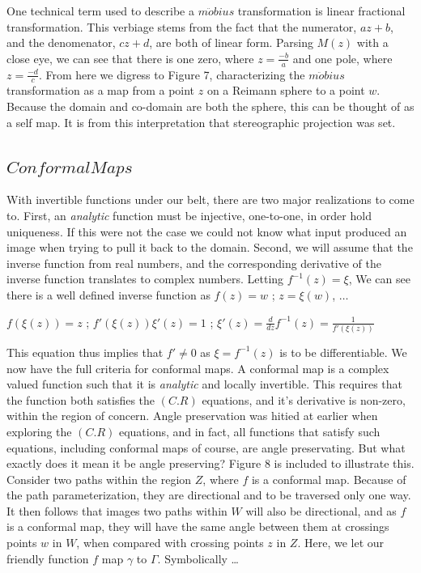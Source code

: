 \documentclass[a4paper,man,natbib]{apa6}
\begin{document}
One technical term used to describe a $ m\ddot{o}bius $ transformation is linear fractional transformation.
This verbiage stems from the fact that the numerator, $ az + b $, and the denomenator, $ cz + d $, are both of linear form.
Parsing $ M(z) $ with a close eye, we can see that there is one zero, where $ z = \frac{-b}{a} $ and one pole, where $ z = \frac{-d}{c} $.
From here we digress to Figure 7, characterizing the $ m\ddot{o}bius $ transformation as a map from a point $ z $ on a Reimann sphere to a point $ w $.
Because the domain and co-domain are both the sphere, this can be thought of as a self map. It is from this interpretation that stereographic projection was set.

\subsection{$ Conformal Maps $}

With invertible functions under our belt, there are two major realizations to come to.
First, an \textit{analytic} function must be injective, one-to-one, in order hold uniqueness.
If this were not the case we could not know what input produced an image when trying to pull it back to the domain.
Second, we will assume that the inverse function from real numbers, and the corresponding derivative of the inverse function translates to complex numbers.
Letting $ f^{-1}(z) = \xi $, We can see there is a well defined inverse function as $ f(z) = w $ ; $ z = \xi(w) $, $ \dots $

\begin{center}

      $ f(\xi(z)) = z $ ; $ f'(\xi(z))\xi'(z) = 1 $ ; $ \xi'(z) = \frac{d}{dz}f^{-1}(z) = \frac{1}{f'(\xi(z))} $

\end{center}

This equation thus implies that $ f' \neq 0 $ as $ \xi = f^{-1}(z) $ is to be differentiable. We now have the full criteria for conformal maps.
A conformal map is a complex valued function such that it is \textit{analytic} and locally invertible.
This requires that the function both satisfies the $ (C.R) $ equations, and it's derivative is non-zero, within the region of concern.
Angle preservation was hitied at earlier when exploring the $ (C.R) $ equations, and in fact, all functions that satisfy such equations, including conformal maps of course, are angle preservating.
But what exactly does it mean it be angle preserving? Figure 8 is included to illustrate this.
Consider two paths within the region $ Z $, where $ f $ is a conformal map. Because of the path parameterization, they are directional and to be traversed only one way.
It then follows that images two paths within $ W $ will also be directional, and as $ f $ is a conformal map,
they will have the same angle between them at crossings points $ w $ in $ W $, when compared with crossing points $ z $ in $ Z $.
Here, we let our friendly function $ f $ map $ \gamma $ to $ \Gamma $. Symbolically \dots
\end{document}
